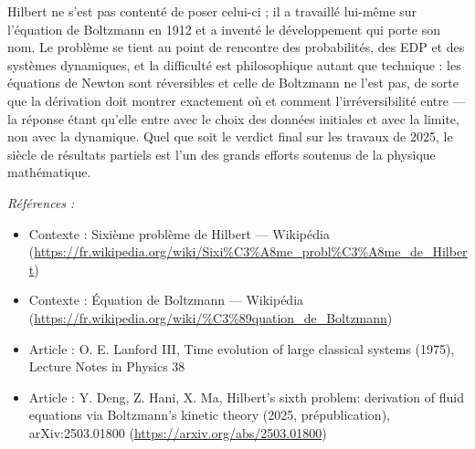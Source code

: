\documentclass[11pt]{article}
\newenvironment{refs}{\par\small\noindent\emph{Références :}\begin{itemize}\setlength\itemsep{0pt}}{\end{itemize}\normalsize}
\begin{document}
\noindent Hilbert ne s'est pas contenté de poser celui-ci ; il a travaillé lui-même sur
l'équation de Boltzmann en 1912 et a inventé le développement qui porte son nom. Le problème se
tient au point de rencontre des probabilités, des EDP et des systèmes dynamiques, et la difficulté
est philosophique autant que technique : les équations de Newton sont réversibles et celle de
Boltzmann ne l'est pas, de sorte que la dérivation doit montrer exactement où et comment
l'irréversibilité entre --- la réponse étant qu'elle entre avec le choix des données initiales et
avec la limite, non avec la dynamique. Quel que soit le verdict final sur les travaux de 2025, le
siècle de résultats partiels est l'un des grands efforts soutenus de la physique
mathématique.

\begin{refs}
\item Contexte : Sixième problème de Hilbert --- Wikipédia (\url{https://fr.wikipedia.org/wiki/Sixi%C3%A8me_probl%C3%A8me_de_Hilbert})
\item Contexte : Équation de Boltzmann --- Wikipédia (\url{https://fr.wikipedia.org/wiki/%C3%89quation_de_Boltzmann})
\item Article : O. E. Lanford III, \og{} Time evolution of large classical systems \fg{} (1975), Lecture Notes in Physics 38
\item Article : Y. Deng, Z. Hani, X. Ma, \og{} Hilbert's sixth problem: derivation of fluid equations via Boltzmann's kinetic theory \fg{} (2025, prépublication), arXiv:2503.01800 (\url{https://arxiv.org/abs/2503.01800})
\end{refs}

\bigskip
\end{document}
